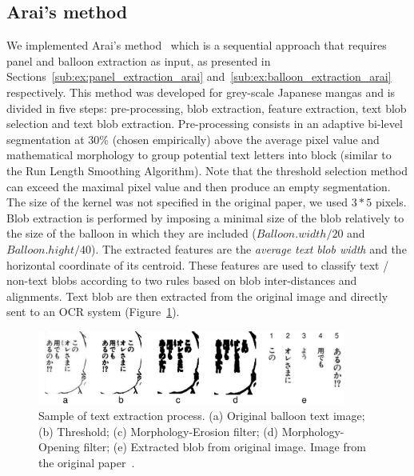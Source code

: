 

\subsection{Arai's method} %
We implemented Arai's method~\cite{Arai11} which is a sequential approach that requires panel and balloon extraction as input, as presented in Sections~\ref{sub:ex:panel_extraction_arai} and~\ref{sub:ex:balloon_extraction_arai} respectively.
This method was developed for grey-scale Japanese mangas and is divided in five steps: pre-processing, blob extraction, feature extraction, text blob selection and text blob extraction.
Pre-processing consists in an adaptive bi-level segmentation at 30\% (chosen empirically) above the average pixel value and mathematical morphology to group potential text letters into block (similar to the Run Length Smoothing Algorithm).
Note that the threshold selection method can exceed the maximal pixel value and then produce an empty segmentation.
The size of the kernel was not specified in the original paper, we used $3*5$ pixels.
Blob extraction is performed by imposing a minimal size of the blob relatively to the size of the balloon in which they are included ($Balloon.width / 20$ and $Balloon.hight / 40$).
The extracted features are the \emph{average text blob width} and the horizontal coordinate of its centroid.
These features are used to classify text / non-text blobs according to two rules based on blob inter-distances and alignments.
Text blob are then extracted from the original image and directly sent to an OCR system (Figure~\ref{fig:ex:balloon_extraction_arai}).

\begin{figure}[h]
 \centering
 \includegraphics[width=0.9\textwidth]{balloon_extraction_arai.png}
 \caption[Sample of text extraction process of Arai's method]{Sample of text extraction process. (a) Original balloon text image; (b) Threshold; (c) Morphology-Erosion filter; (d) Morphology-Opening filter; (e) Extracted blob from original image. Image from the original paper~\cite{Arai11}.
 }
 \label{fig:ex:balloon_extraction_arai}
\end{figure}

